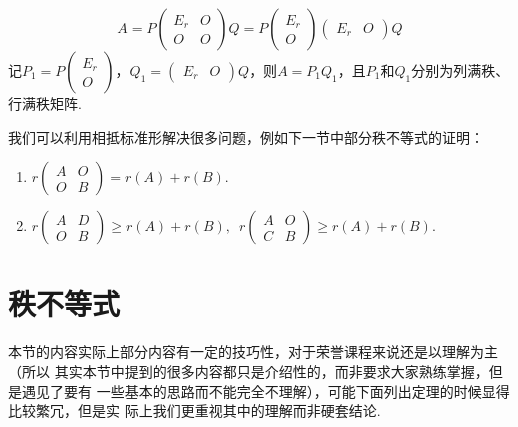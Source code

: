 $$A=P\begin{pmatrix}
    E_r & O \\ O & O
\end{pmatrix}Q=P\begin{pmatrix}
    E_r \\ O
\end{pmatrix}\begin{pmatrix}
    E_r & O
\end{pmatrix}Q$$
记$P_1=P\begin{pmatrix}
    E_r \\ O
\end{pmatrix}$，$Q_1=\begin{pmatrix}
    E_r & O
\end{pmatrix}Q$，则$A=P_1Q_1$，且$P_1$和$Q_1$分别为列满秩、行满秩矩阵.

我们可以利用相抵标准形解决很多问题，例如下一节中部分秩不等式的证明：
\begin{example}
    \begin{enumerate}
        \item $r\begin{pmatrix}
            A & O \\ O & B
        \end{pmatrix}=r(A)+r(B)$.

        \item $r\begin{pmatrix}
            A & D \\ O & B
        \end{pmatrix}\geqslant r(A)+r(B),\enspace r\begin{pmatrix}
            A & O \\ C & B
        \end{pmatrix}\geqslant r(A)+r(B)$.
    \end{enumerate}
\end{example}

\section{秩不等式}
本节的内容实际上部分内容有一定的技巧性，对于荣誉课程来说还是以理解为主（所以
其实本节中提到的很多内容都只是介绍性的，而非要求大家熟练掌握，但是遇见了要有
一些基本的思路而不能完全不理解），可能下面列出定理的时候显得比较繁冗，但是实
际上我们更重视其中的理解而非硬套结论.

